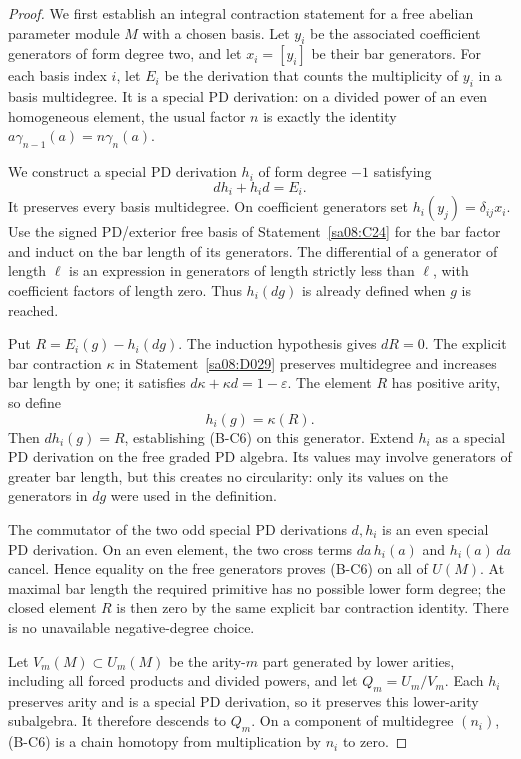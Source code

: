 \begin{proof}
We first establish an integral contraction
statement for a free abelian parameter
module $M$ with a chosen basis.
Let $y_i$ be the associated coefficient
generators of form degree two, and let
$x_i=[y_i]$ be their bar generators.
For each basis index $i$, let $E_i$
be the derivation that counts the
multiplicity of $y_i$ in a basis
multidegree. It is a special PD
derivation: on a divided power of
an even homogeneous element,
the usual factor $n$ is exactly
the identity
$a\gamma_{n-1}(a)=n\gamma_n(a)$.

We construct a special PD derivation
$h_i$ of form degree $-1$ satisfying
\begin{equation}
 dh_i+h_i d=E_i.
 \tag{B-C6}
\end{equation}
It preserves every basis multidegree.
On coefficient generators set
$h_i(y_j)=\delta_{ij}x_i$.
Use the signed PD/exterior free basis
of Statement~\ref{sa08:C24} for the bar
factor and induct on the bar length
of its generators. The differential
of a generator of length $\ell$ is
an expression in generators of
length strictly less than $\ell$,
with coefficient factors of length
zero. Thus $h_i(dg)$ is already
defined when $g$ is reached.

Put $R=E_i(g)-h_i(dg)$. The induction
hypothesis gives $dR=0$. The explicit
bar contraction $\kappa$ in
Statement~\ref{sa08:D029} preserves
multidegree and increases bar length
by one; it satisfies
$d\kappa+\kappa d=1-\varepsilon$.
The element $R$ has positive arity,
so define
\[
 h_i(g)=\kappa(R).
\]
Then $dh_i(g)=R$, establishing (B-C6)
on this generator. Extend $h_i$ as
a special PD derivation on the free
graded PD algebra. Its values may
involve generators of greater bar
length, but this creates no
circularity: only its values on
the generators in $dg$ were used
in the definition.

The commutator of the two odd special
PD derivations $d,h_i$ is an even
special PD derivation. On an even
element, the two cross terms
$da\,h_i(a)$ and $h_i(a)\,da$
cancel. Hence equality on the
free generators proves (B-C6)
on all of $U(M)$. At maximal
bar length the required primitive
has no possible lower form degree;
the closed element $R$ is then
zero by the same explicit bar
contraction identity. There is no
unavailable negative-degree choice.

Let $V_m(M)\subset U_m(M)$ be the
arity-$m$ part generated by lower
arities, including all forced
products and divided powers, and
let $Q_m=U_m/V_m$. Each $h_i$
preserves arity and is a special
PD derivation, so it preserves
this lower-arity subalgebra.
It therefore descends to $Q_m$.
On a component of multidegree
$(n_i)$, (B-C6) is a chain
homotopy from multiplication
by $n_i$ to zero.


\end{proof}
